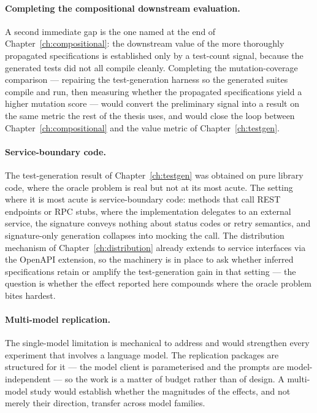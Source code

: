 \paragraph{Completing the compositional downstream evaluation.} A second immediate
gap is the one named at the end of Chapter~\ref{ch:compositional}: the downstream
value of the more thoroughly propagated specifications is established only by a
test-count signal, because the generated tests did not all compile cleanly.
Completing the mutation-coverage comparison --- repairing the test-generation
harness so the generated suites compile and run, then measuring whether the
propagated specifications yield a higher mutation score --- would convert the
preliminary signal into a result on the same metric the rest of the thesis uses,
and would close the loop between Chapter~\ref{ch:compositional} and the value metric
of Chapter~\ref{ch:testgen}.

\paragraph{Service-boundary code.} The test-generation result of
Chapter~\ref{ch:testgen} was obtained on pure library code, where the oracle
problem is real but not at its most acute. The setting where it is most acute is
service-boundary code: methods that call REST endpoints or RPC stubs, where the
implementation delegates to an external service, the signature conveys nothing
about status codes or retry semantics, and signature-only generation collapses
into mocking the call. The distribution mechanism of Chapter~\ref{ch:distribution}
already extends to service interfaces via the OpenAPI extension, so the machinery
is in place to ask whether inferred specifications retain or amplify the
test-generation gain in that setting --- the question is whether the effect
reported here compounds where the oracle problem bites hardest.

\paragraph{Multi-model replication.} The single-model limitation is mechanical
to address and would strengthen every experiment that involves a language model.
The replication packages are structured for it --- the model client is
parameterised and the prompts are model-independent --- so the work is a matter
of budget rather than of design. A multi-model study would establish whether the
magnitudes of the effects, and not merely their direction, transfer across model
families.

